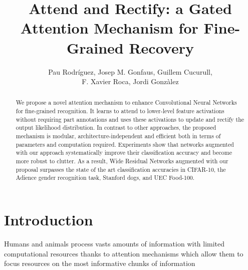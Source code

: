 \documentclass[runningheads]{llncs}
\begin{document}
\pagestyle{headings}
\mainmatter
\def\ECCV18SubNumber{2126}  

\title{Attend and Rectify: a Gated Attention Mechanism for Fine-Grained Recovery} 



\author{Pau Rodr\'{i}guez, Josep M. Gonfaus, Guillem Cucurull, \\ F. Xavier Roca, Jordi Gonz\`{a}lez}



\maketitle

\begin{abstract}
We propose a novel attention mechanism to enhance Convolutional
Neural Networks for fine-grained recognition. It learns to attend to lower-level feature activations without requiring part annotations and uses these activations to update and rectify the output likelihood distribution. In contrast to other approaches, the proposed mechanism is modular, architecture-independent and efficient both in terms of parameters and computation required. Experiments show that networks augmented with our approach systematically improve their classification accuracy and become more robust to clutter. As a result, Wide Residual Networks augmented with our proposal surpasses the state of the art classification accuracies in CIFAR-10, the Adience gender recognition task, Stanford dogs, and UEC Food-100.

\end{abstract}


\section{Introduction}
Humans and animals process vasts amounts of information with limited computational resources thanks to attention mechanisms which allow them to focus resources on the most informative chunks of information \cite{anderson1985cognitive,desimone1995neural,ungerleider2000mechanisms} 
\end{document}
